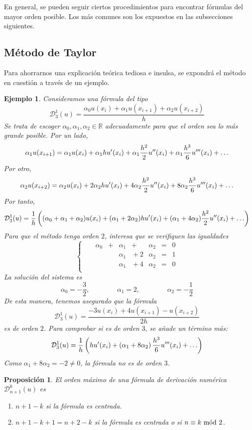 \documentclass[11pt]{report}
\theoremstyle{mytheorem}
\newtheorem{proposition}{Proposición}
\theoremstyle{mydefinition}
\theoremstyle{myexample}
\newtheorem*{example}{Ejemplo}
\newenvironment{cproposition} %
  {\begin{mdframed}[
        linewidth=3pt,
        linecolor=c2,
        bottomline=false,
        topline=false,
        rightline=false,
        innerrightmargin=0pt,
        innertopmargin=0pt,
        innerbottommargin=0pt,
        innerleftmargin=1em, %
        skipabove=\baselineskip]
    \begin{proposition}}
  {\end{proposition}\end{mdframed}}
\newcommand{\R}{\mathbb R}
\begin{document}
En general, se pueden seguir ciertos procedimientos para encontrar fórmulas del mayor orden posible. Los más comunes son los expuestos en las subsecciones siguientes.


\subsection{Método de Taylor}

Para ahorrarnos una explicación teórica tediosa e insulsa, se expondrá el método en cuestión a través de un ejemplo.
\begin{example}
\label{ex31}
    Consideramos una fórmula del tipo
\[\mathcal{D}_3^1(u) = \frac{\alpha_0u(x_i)+\alpha_1u(x_{i+1})+\alpha_2u(x_{i+2})}{h}\]
Se trata de escoger $\alpha_0, \alpha_1,\alpha_2 \in \R$ adecuadamente para que el orden sea lo más grande posible. Por un lado,
\[\alpha_1u(x_{i+1}) = \alpha_1u(x_i)+\alpha_1hu'(x_i)+\alpha_1\frac{h^2}{2}u''(x_i)+\alpha_1\frac{h^3}{6}u'''(x_i)+\mathellipsis\]
Por otro,
\[\alpha_2u(x_{i+2}) = \alpha_2u(x_i)+2\alpha_2hu'(x_i)+4\alpha_2\frac{h^2}{2}u''(x_i)+8\alpha_2\frac{h^3}{6}u'''(x_i)+\mathellipsis\]
Por tanto,
\[\mathcal{D}_3^1(u)=\frac{1}{h}\left((\alpha_0+\alpha_1+\alpha_2)u(x_i)+(\alpha_1+2\alpha_2)hu'(x_i)+(\alpha_1+4\alpha_2)\frac{h^2}{2}u''(x_i)+\mathellipsis\right)\]
Para que el método tenga orden $2$, interesa que se verifiquen las igualdades
\[
\left\{ \begin{alignedat}{6}
        &  &\alpha_0 & {}+{} &\alpha_1 & {}+{}  &\alpha_2 & {}={} & 0 \\
        &  &         &       &\alpha_1 & {}+{} 2&\alpha_2 & {}={} & 1 \\
        &  &         &       &\alpha_1 & {}+{} 4&\alpha_2 & {}={} & 0 \\
\end{alignedat} \right.
\]
La solución del sistema es
\[\alpha_0 = -\frac{3}{2}, \qquad \qquad \alpha_1=2, \qquad \qquad \alpha_2=-\frac{1}{2}\]
De esta manera, tenemos asegurado que la fórmula
\[\mathcal{D}_3^1(u) = \frac{-3u(x_i)+4u(x_{i+1})-u(x_{i+2})}{2h}\]
es de orden $2$. Para comprobar si es de orden $3$, se añade un término más:
\[\mathcal{D}_3^1(u)=\frac{1}{h}\left(hu'(x_i)+ \left(\alpha_1+8\alpha_2\right)\frac{h^3}{6}u'''(x_i)+\mathellipsis\right)\]
Como $\alpha_1+8\alpha_2 = -2 \neq 0$, la fórmula no es de orden $3$.
\end{example}

\begin{cproposition}
    El orden máximo de una fórmula de derivación numérica $\mathcal{D}_{n+1}^k(u)$ es
    \begin{enumerate}
        \item $n+1-k$ si la fórmula es centrada.
        \item $n+1-k+1 = n+2-k$ si la fórmula es centrada o si $n \equiv k \textup{ mód } 2$.
    \end{enumerate}
\end{cproposition}
\end{document}
